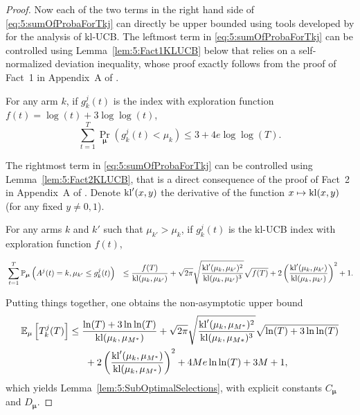 \begin{proof}
  Now each of the two terms in the right hand side of \eqref{eq:5:sumOfProbaForTkj} can directly be upper bounded using tools developed by \cite{KLUCBJournal} for the analysis of kl-UCB.
  The leftmost term in \eqref{eq:5:sumOfProbaForTkj} can be controlled using Lemma~\ref{lem:5:Fact1KLUCB} below that relies on a self-normalized deviation inequality, whose proof exactly follows from the proof of Fact~1 in Appendix~A of \cite{KLUCBJournal}.

  \begin{lemma}\label{lem:5:Fact1KLUCB}
      For any arm $k$, if $g_k^{j}(t)$ is the \klUCB{} index with exploration function $f(t)=\log(t)+3\log\log(t)$,
      \begin{equation}
        \sum_{t=1}^T \Pr_{\bm{\mu}} \left(g_k^{j}(t) < \mu_k\right) \leq 3 + 4e \log\log(T).
      \end{equation}
  \end{lemma}

  The rightmost term in \eqref{eq:5:sumOfProbaForTkj} can be controlled using Lemma~\ref{lem:5:Fact2KLUCB}, that is a direct consequence of the proof of Fact~2 in Appendix~A of \cite{KLUCBJournal}.
  Denote $\mathrm{kl}'(x,y)$ the derivative of the function $x \mapsto \mathrm{kl}(x,y)$ (for any fixed $y\neq 0, 1$).

  \begin{lemma}\label{lem:5:Fact2KLUCB}
    For any arms $k$ and $k'$ such that $\mu_{k'} > \mu_{k}$, if $g_k^{j}(t)$ is the kl-UCB index with exploration function $f(t)$,
    \begin{small} %
      \begin{align*}
        &\sum_{t=1}^T\mathbb{P}_{\bm{\mu}} \left( A^j(t) = k, \mu_{k'} \leq g_k^{j}(t) \right) & \leq  \frac{f(T)}{\mathrm{kl}(\mu_k,\mu_{k'})}
        + \sqrt{2\pi} \sqrt{\frac{\mathrm{kl}'(\mu_k,\mu_{k'})^2}{\mathrm{kl}(\mu_k,\mu_{k'})^3}}\sqrt{f(T)} + 2\left(\frac{\mathrm{kl}'(\mu_k,\mu_{k'})}{\mathrm{kl}(\mu_k,\mu_{k'})}\right)^2 + 1.
      \end{align*}
    \end{small} %
\end{lemma}

  Putting things together, one obtains the non-asymptotic upper bound
  \begin{align}\label{eq:5:UBprecise}
    \mathbb{E}_{\mu}\left[T_k^j(T)\right]
    & \leq \frac{\ln(T) + 3 \ln\ln(T)}{\mathrm{kl}(\mu_k,\mu_{M^*})} + \sqrt{2\pi} \sqrt{\frac{\mathrm{kl}'(\mu_k,\mu_{M^*})^2}{\mathrm{kl}(\mu_k,\mu_{M*})^3}}\sqrt{\ln(T) + 3\ln\ln(T)}  \nonumber\\
    & \;\;\;\;\;\;+ 2\left(\frac{\mathrm{kl}'(\mu_k,\mu_{M^*})}{\mathrm{kl}(\mu_k,\mu_{M^*})}\right)^2 + 4Me \ln\ln(T) + 3M+1,
  \end{align}
  which yields Lemma~\ref{lem:5:SubOptimalSelections},
  with explicit constants $C_{\boldsymbol{\mu}}$ and $D_{\boldsymbol{\mu}}$.
\end{proof}


